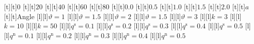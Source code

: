 \documentclass{article}
\begin{document}
\begin{center}
[t][t]{\large $0$}
[t][t]{\large $20$}
[t][t]{\large $40$}
[t][t]{\large $60$}
[t][t]{\large $80$}
[t][t]{\large $0.0$}
[t][t]{\large $0.5$}
[t][t]{\large $1.0$}
[t][t]{\large $1.5$}
[t][t]{\large $2.0$}
[t][t]{\Large $a$}
[t][t]{\Large Angle}
[l][l]{\footnotesize $\vartheta = 1$}
[l][l]{\footnotesize $\vartheta = 1.5$}
[l][l]{\footnotesize $\vartheta = 2$}
[l][l]{\footnotesize $\vartheta = 1.5$}
[l][l]{\footnotesize $\vartheta = 3$}
[l][l]{\footnotesize $k = 3$}
[l][l]{\footnotesize $k = 10$}
[l][l]{\footnotesize $k = 50$}
[l][l]{\footnotesize $q^{\mathrm{s}} = 0.1$}
[l][l]{\footnotesize $q^{\mathrm{s}} = 0.2$}
[l][l]{\footnotesize $q^{\mathrm{s}} = 0.3$}
[l][l]{\footnotesize $q^{\mathrm{s}} = 0.4$}
[l][l]{\footnotesize $q^{\mathrm{s}} = 0.5$}
[l][l]{\footnotesize $q^{\mathrm{n}} = 0.1$}
[l][l]{\footnotesize $q^{\mathrm{n}} = 0.2$}
[l][l]{\footnotesize $q^{\mathrm{n}} = 0.3$}
[l][l]{\footnotesize $q^{\mathrm{n}} = 0.4$}
[l][l]{\footnotesize $q^{\mathrm{n}} = 0.5$}

\end{center}
\end{document}
